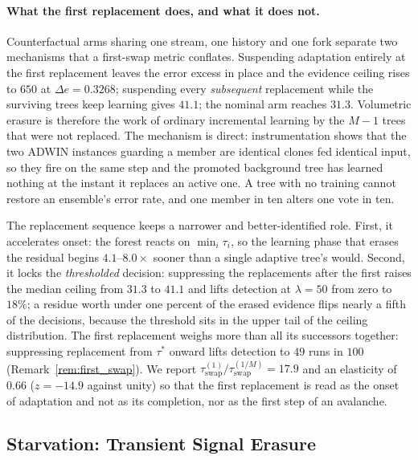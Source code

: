 \documentclass[smallextended]{svjour3}
\newcommand{\SixCanonDeltaE}{0.3268}         %
\newcommand{\SixCeilingFull}{31.3}           %
\newcommand{\SixCeilingNoSwap}{41.1}         %
\newcommand{\SixCeilingFrozen}{650}          %
\newcommand{\NoSwapLeak}{18}                 %
\newcommand{\SwapRatio}{17.9}                %
\newcommand{\SwapElasticity}{0.66}           %
\newcommand{\SwapElasticityZ}{-14.9}         %
\newcommand{\AbInitDetect}{49}               %
\begin{document}
\paragraph{What the first replacement does, and what it does not.}
Counterfactual arms sharing one stream, one history and one fork separate two mechanisms that a first-swap metric conflates. Suspending adaptation entirely at the first replacement leaves the error excess in place and the evidence ceiling rises to $\SixCeilingFrozen$ at $\Delta e = \SixCanonDeltaE$; suspending every \emph{subsequent} replacement while the surviving trees keep learning gives $\SixCeilingNoSwap$; the nominal arm reaches $\SixCeilingFull$. Volumetric erasure is therefore the work of ordinary incremental learning by the $M-1$ trees that were not replaced. The mechanism is direct: instrumentation shows that the two ADWIN instances guarding a member are identical clones fed identical input, so they fire on the same step and the promoted background tree has learned nothing at the instant it replaces an active one. A tree with no training cannot restore an ensemble's error rate, and one member in ten alters one vote in ten.

The replacement sequence keeps a narrower and better-identified role. First, it accelerates onset: the forest reacts on $\min_i \tau_i$, so the learning phase that erases the residual begins $4.1$--$8.0\times$ sooner than a single adaptive tree's would. Second, it locks the \emph{thresholded} decision: suppressing the replacements after the first raises the median ceiling from $\SixCeilingFull$ to $\SixCeilingNoSwap$ and lifts detection at $\lambda = 50$ from zero to $\NoSwapLeak\%$; a residue worth under one percent of the erased evidence flips nearly a fifth of the decisions, because the threshold sits in the upper tail of the ceiling distribution. The first replacement weighs more than all its successors together: suppressing replacement from $\tau^*$ onward lifts detection to $\AbInitDetect$ runs in $100$ (Remark~\ref{rem:first_swap}). We report $\tau_{\mathrm{swap}}^{(1)}/\tau_{\mathrm{swap}}^{(1/M)} = \SwapRatio$ and an elasticity of $\SwapElasticity$ ($z = \SwapElasticityZ$ against unity) so that the first replacement is read as the onset of adaptation and not as its completion, nor as the first step of an avalanche.

\subsection{Starvation: Transient Signal Erasure}\label{sec:starvation}
\end{document}
